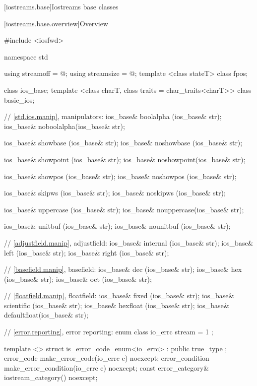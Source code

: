 [iostreams.base]{Iostreams base classes}

[iostreams.base.overview]{Overview}

%

\begin{codeblock}
#include <iosfwd>

namespace std {
  using streamoff  = @\impdef@;
  using streamsize = @\impdef@;
  template <class stateT> class fpos;

  class ios_base;
  template <class charT, class traits = char_traits<charT>>
    class basic_ios;

  // \ref{std.ios.manip}, manipulators:
  ios_base& boolalpha  (ios_base& str);
  ios_base& noboolalpha(ios_base& str);

  ios_base& showbase   (ios_base& str);
  ios_base& noshowbase (ios_base& str);

  ios_base& showpoint  (ios_base& str);
  ios_base& noshowpoint(ios_base& str);

  ios_base& showpos    (ios_base& str);
  ios_base& noshowpos  (ios_base& str);

  ios_base& skipws     (ios_base& str);
  ios_base& noskipws   (ios_base& str);

  ios_base& uppercase  (ios_base& str);
  ios_base& nouppercase(ios_base& str);

  ios_base& unitbuf    (ios_base& str);
  ios_base& nounitbuf  (ios_base& str);

  // \ref{adjustfield.manip}, adjustfield:
  ios_base& internal   (ios_base& str);
  ios_base& left       (ios_base& str);
  ios_base& right      (ios_base& str);

  // \ref{basefield.manip}, basefield:
  ios_base& dec        (ios_base& str);
  ios_base& hex        (ios_base& str);
  ios_base& oct        (ios_base& str);

  // \ref{floatfield.manip}, floatfield:
  ios_base& fixed      (ios_base& str);
  ios_base& scientific (ios_base& str);
  ios_base& hexfloat   (ios_base& str);
  ios_base& defaultfloat(ios_base& str);

  // \ref{error.reporting}, error reporting:
  enum class io_errc {
    stream = 1
  };

  template <> struct is_error_code_enum<io_errc> : public true_type { };
  error_code make_error_code(io_errc e) noexcept;
  error_condition make_error_condition(io_errc e) noexcept;
  const error_category& iostream_category() noexcept;
}
\end{codeblock}
%
%
%
%
%

